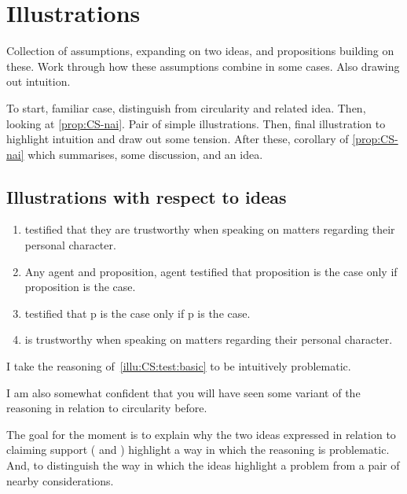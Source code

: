 \section{Illustrations}
\label{sec:CS:illustrations}



\begin{note}
  Collection of assumptions, expanding on two ideas, and propositions building on these.
  Work through how these assumptions combine in some cases.
  Also drawing out intuition.

  To start, familiar case, distinguish from circularity and related idea.
  Then, looking at \autoref{prop:CS-nai}.
  Pair of simple illustrations.
  Then, final illustration to highlight intuition and draw out some tension.
  After these, corollary of \autoref{prop:CS-nai} which summarises, some discussion, and an idea.
\end{note}

\subsection{Illustrations with respect to ideas}

\begin{note}[Testimony 1]
  \begin{illustration}[Testimony 1]
    \label{illu:CS:test:basic}
    \mbox{}
    \begin{enumerate}[label=\arabic*., ref=(\arabic*)]
    \item\label{ex:eiS:t:basic:test}  testified that they are trustworthy when speaking on matters regarding their personal character.
    \item Any agent and proposition, agent testified that proposition is the case only if proposition is the case.
    \item {} testified that p is the case only if p is the case.
    \item\label{ex:eiS:t:basic:ok}  is trustworthy when speaking on matters regarding their personal character.
    \end{enumerate}
  \end{illustration}

  I take the reasoning of~\autoref{illu:CS:test:basic} to be intuitively problematic.

  I am also somewhat confident that you will have seen some variant of the reasoning in relation to circularity before.

  The goal for the moment is to explain why the two ideas expressed in relation to claiming support (\nfcs{} and \eiS{}) highlight a way in which the reasoning is problematic.
  And, to distinguish the way in which the ideas highlight a problem from a pair of nearby considerations.
\end{note}

